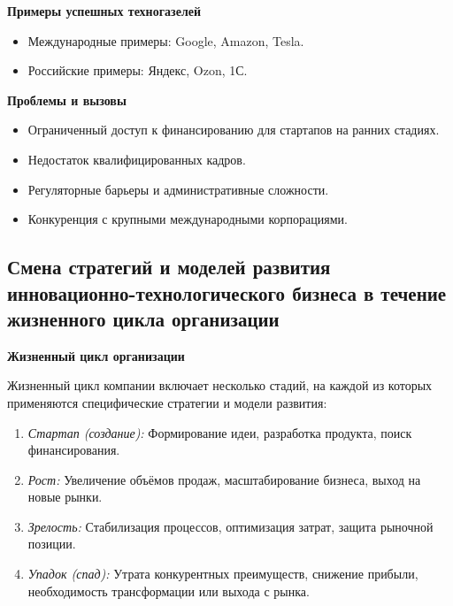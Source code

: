 \textbf{Примеры успешных техногазелей}
\begin{itemize}
    \item Международные примеры: Google, Amazon, Tesla.
    \item Российские примеры: Яндекс, Ozon, 1С.
\end{itemize}

\textbf{Проблемы и вызовы}
\begin{itemize}
    \item Ограниченный доступ к финансированию для стартапов на ранних стадиях.
    \item Недостаток квалифицированных кадров.
    \item Регуляторные барьеры и административные сложности.
    \item Конкуренция с крупными международными корпорациями.
\end{itemize}

\pagebreak
\subsection{Смена стратегий и моделей развития инновационно-технологического бизнеса в течение жизненного цикла организации}

\textbf{Жизненный цикл организации}

Жизненный цикл компании включает несколько стадий, на каждой из которых применяются специфические стратегии и модели развития:
\begin{enumerate}
    \item \textit{Стартап (создание):} Формирование идеи, разработка продукта, поиск финансирования.
    \item \textit{Рост:} Увеличение объёмов продаж, масштабирование бизнеса, выход на новые рынки.
    \item \textit{Зрелость:} Стабилизация процессов, оптимизация затрат, защита рыночной позиции.
    \item \textit{Упадок (спад):} Утрата конкурентных преимуществ, снижение прибыли, необходимость трансформации или выхода с рынка.
\end{enumerate}

